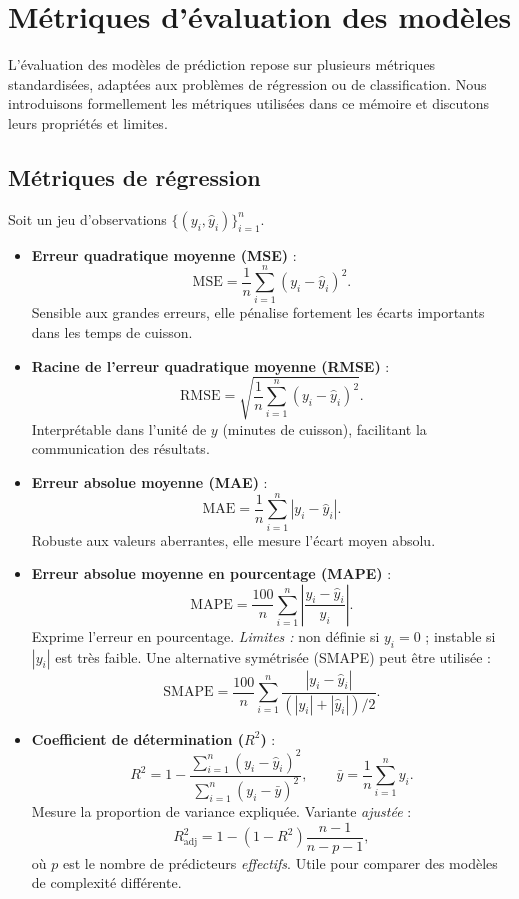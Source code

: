 \section{Métriques d’évaluation des modèles}
L’évaluation des modèles de prédiction repose sur plusieurs métriques standardisées, adaptées aux problèmes de régression ou de classification. Nous introduisons formellement les métriques utilisées dans ce mémoire et discutons leurs propriétés et limites.

\subsection{Métriques de régression}
Soit un jeu d’observations \(\{(y_i,\hat{y}_i)\}_{i=1}^n\).
\begin{itemize}
    \item \textbf{Erreur quadratique moyenne (MSE)} :
          \[
              \mathrm{MSE} = \frac{1}{n} \sum_{i=1}^{n} (y_i - \hat{y}_i)^2.
          \]
          Sensible aux grandes erreurs, elle pénalise fortement les écarts importants dans les temps de cuisson.
    \item \textbf{Racine de l’erreur quadratique moyenne (RMSE)} :
          \[
              \mathrm{RMSE} = \sqrt{\frac{1}{n} \sum_{i=1}^{n} (y_i - \hat{y}_i)^2}.
          \]
          Interprétable dans l’unité de \(y\) (minutes de cuisson), facilitant la communication des résultats.
    \item \textbf{Erreur absolue moyenne (MAE)} :
          \[
              \mathrm{MAE} = \frac{1}{n} \sum_{i=1}^{n} |y_i - \hat{y}_i|.
          \]
          Robuste aux valeurs aberrantes, elle mesure l’écart moyen absolu.
    \item \textbf{Erreur absolue moyenne en pourcentage (MAPE)} :
          \[
              \mathrm{MAPE} = \frac{100}{n} \sum_{i=1}^{n} \left| \frac{y_i - \hat{y}_i}{y_i} \right|.
          \]
          Exprime l’erreur en pourcentage. \textit{Limites :} non définie si \(y_i=0\) ; instable si \(|y_i|\) est très faible. Une alternative symétrisée (SMAPE) peut être utilisée :
          \[
              \mathrm{SMAPE} = \frac{100}{n} \sum_{i=1}^{n} \frac{|y_i - \hat{y}_i|}{(|y_i| + |\hat{y}_i|)/2}.
          \]
    \item \textbf{Coefficient de détermination (\(R^2\))} :
          \[
              R^2 = 1 - \frac{\sum_{i=1}^n (y_i - \hat{y}_i)^2}{\sum_{i=1}^n (y_i - \bar{y})^2}, \qquad \bar{y} = \frac{1}{n} \sum_{i=1}^n y_i.
          \]
          Mesure la proportion de variance expliquée. Variante \emph{ajustée} :
          \[
              R^2_{\text{adj}} = 1 - (1 - R^2) \frac{n - 1}{n - p - 1},
          \]
          où \(p\) est le nombre de prédicteurs \emph{effectifs}. Utile pour comparer des modèles de complexité différente.
\end{itemize}

